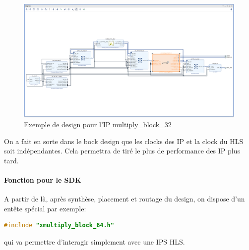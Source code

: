\documentclass[12pt,a4paper]{article}
\begin{document}
\begin{figure}[H]
	\centering
	\includegraphics[width=\linewidth]{im/ip3.png}	
	\caption{Exemple de design pour l'IP multiply\_block\_32}
	\label{fig-ip}
\end{figure}

On a fait en sorte dans le bock design que les clocks des IP et la clock du HLS soit indépendantes. Cela permettra de tiré le plus de performance des IP plus tard.


\paragraph{Fonction pour le SDK}
A partir de là, après synthèse, placement et routage du design, on dispose d'un entête spécial par exemple:
\begin{lstlisting}[language=C]
#include "xmultiply_block_64.h"
\end{lstlisting}
qui va permettre d'interagir simplement avec une IPS HLS.
\end{document}
